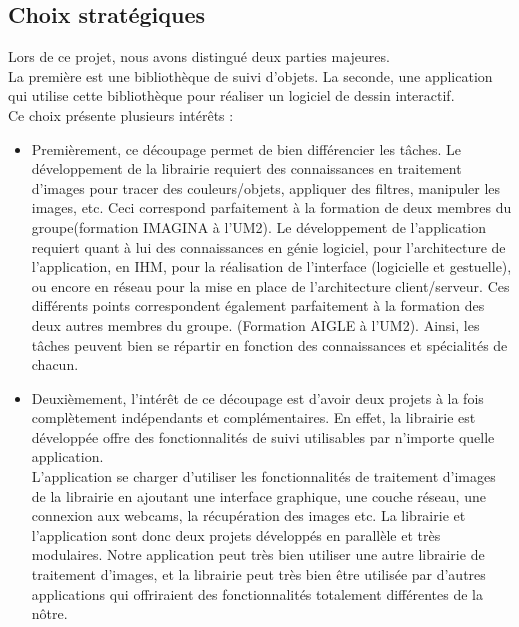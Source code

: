 \documentclass{report}
\begin{document}
			\subsection{Choix stratégiques}
			Lors de ce projet, nous avons distingué deux parties majeures. \\
			La première est une bibliothèque de suivi d'objets. La seconde, une application qui utilise cette bibliothèque pour réaliser un logiciel de dessin interactif. \\
			Ce choix présente plusieurs intérêts : \\
			\begin{itemize}
				\item{Premièrement, ce découpage permet de bien différencier les tâches. Le développement de la librairie requiert des connaissances en traitement d'images pour tracer des couleurs/objets, appliquer des filtres, manipuler les images, etc. Ceci correspond parfaitement à la formation de deux membres du groupe(formation IMAGINA à l'UM2). 
				Le développement de l'application requiert quant à lui des connaissances en génie logiciel, pour l'architecture de l'application, en IHM, pour la réalisation de l'interface (logicielle et gestuelle), ou encore en réseau pour la mise en place de l'architecture client/serveur. 
				Ces différents points correspondent également parfaitement à la formation des deux autres membres du groupe. (Formation AIGLE à l'UM2). Ainsi, les tâches peuvent bien se répartir en fonction des connaissances et spécialités de chacun.} \\
				\item{Deuxièmement, l'intérêt de ce découpage est d'avoir deux projets à la fois complètement indépendants et complémentaires. En effet, la librairie est développée offre des fonctionnalités de suivi utilisables par n'importe quelle application.\\
				L'application se charger d'utiliser les fonctionnalités de traitement d'images de la librairie en ajoutant une interface graphique, une couche réseau, une connexion aux webcams, la récupération des images etc.
				La librairie et l'application sont donc deux projets développés en parallèle et très modulaires. Notre application peut très bien utiliser une autre librairie de traitement d'images, et la librairie peut très bien être utilisée par d'autres applications qui offriraient des fonctionnalités totalement différentes de la nôtre.}
			\end{itemize}
			\newpage
\end{document}
